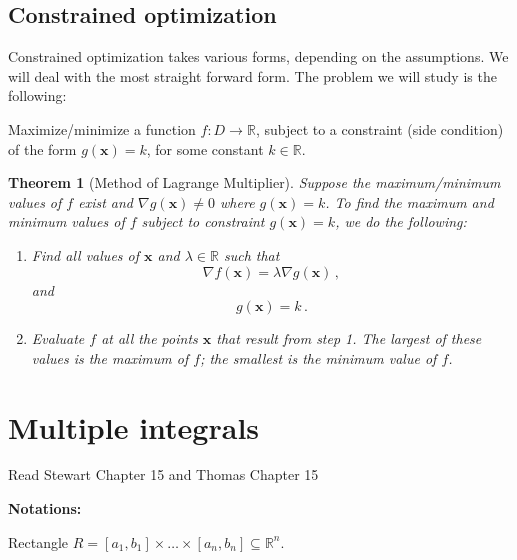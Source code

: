 \documentclass[
]{article}
\newtheorem{theorem}{Theorem}[section]
\theoremstyle{definition}
\theoremstyle{definition}
\theoremstyle{definition}
\theoremstyle{definition}
\theoremstyle{remark}
\begin{document}
\subsection{Constrained optimization}\label{constrained-optimization}

Constrained optimization takes various forms, depending on the assumptions.
We will deal with the most straight forward form.
The problem we will study is the following:

Maximize/minimize a function \(f:D\to \mathbb{R}\), subject to a constraint (side condition)
of the form
\(g(\mathbf{x}) = k\), for some constant \(k\in \mathbb{R}\).

\begin{theorem}[Method of Lagrange Multiplier]

Suppose the maximum/minimum values of \(f\) exist and \(\nabla g(\mathbf{x}) \not=0\) where \(g(\mathbf{x}) = k\).
To find the maximum and minimum values of \(f\) subject to constraint
\(g(\mathbf{x}) = k\), we do the following:

\begin{enumerate}
\def\labelenumi{\arabic{enumi}.}
\item
  Find all values of \(\mathbf{x}\) and \(\lambda \in \mathbb{R}\) such that
  \begin{equation*}
   \nabla f(\mathbf{x}) =\lambda \nabla g(\mathbf{x})\,,
  \end{equation*}
  and
  \begin{equation*}
   g(\mathbf{x}) = k \,.
  \end{equation*}
\item
  Evaluate \(f\) at all the points \(\mathbf{x}\) that result from step 1. The largest of
  these values is the maximum of \(f\); the smallest is the minimum value of \(f\).
\end{enumerate}

\end{theorem}

\newpage

\section{Multiple integrals}\label{multiple-integrals}

Read Stewart Chapter 15 and Thomas Chapter 15

\textbf{Notations:}

Rectangle \(R= [a_1,b_1]\times \dots \times [a_n, b_n] \subseteq \mathbb{R}^n\).
\end{document}
